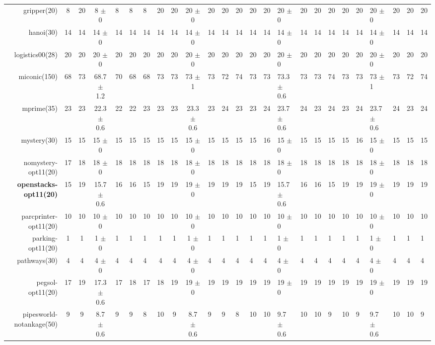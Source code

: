 \begin{center}
\begin{tabular}{|rcccHHH|cccHHHHHHHHHHHHHHH|}
gripper(20) & 8 & 20 & 8 $\pm$ 0 & 8 & 8 & 8 & 20 & 20 & 20 $\pm$ 0 & 20 & 20 & 20 & 20 & 20 & 20 $\pm$ 0 & 20 & 20 & 20 & 20 & 20 & 20 $\pm$ 0 & 20 & 20 & 20\\
hanoi(30) & 14 & 14 & 14 $\pm$ 0 & 14 & 14 & 14 & 14 & 14 & 14 $\pm$ 0 & 14 & 14 & 14 & 14 & 14 & 14 $\pm$ 0 & 14 & 14 & 14 & 14 & 14 & 14 $\pm$ 0 & 14 & 14 & 14\\
logistics00(28) & 20 & 20 & 20 $\pm$ 0 & 20 & 20 & 20 & 20 & 20 & 20 $\pm$ 0 & 20 & 20 & 20 & 20 & 20 & 20 $\pm$ 0 & 20 & 20 & 20 & 20 & 20 & 20 $\pm$ 0 & 20 & 20 & 20\\
miconic(150) & 68 & 73 & 68.7 $\pm$ 1.2 & 70 & 68 & 68 & 73 & 73 & 73 $\pm$ 1 & 73 & 72 & 74 & 73 & 73 & 73.3 $\pm$ 0.6 & 73 & 73 & 74 & 73 & 73 & 73 $\pm$ 1 & 73 & 72 & 74\\
mprime(35) & 23 & 23 & 22.3 $\pm$ 0.6 & 22 & 22 & 23 & 23 & 23 & 23.3 $\pm$ 0.6 & 23 & 24 & 23 & 23 & 24 & 23.7 $\pm$ 0.6 & 24 & 23 & 24 & 23 & 24 & 23.7 $\pm$ 0.6 & 24 & 23 & 24\\
mystery(30) & 15 & 15 & 15 $\pm$ 0 & 15 & 15 & 15 & 15 & 15 & 15 $\pm$ 0 & 15 & 15 & 15 & 15 & 16 & 15 $\pm$ 0 & 15 & 15 & 15 & 15 & 16 & 15 $\pm$ 0 & 15 & 15 & 15\\
nomystery-opt11(20) & 17 & 18 & 18 $\pm$ 0 & 18 & 18 & 18 & 18 & 18 & 18 $\pm$ 0 & 18 & 18 & 18 & 18 & 18 & 18 $\pm$ 0 & 18 & 18 & 18 & 18 & 18 & 18 $\pm$ 0 & 18 & 18 & 18\\
\textbf{openstacks-opt11(20)} & 15 & 19 & 15.7 $\pm$ 0.6 & 16 & 16 & 15 & 19 & 19 & 19 $\pm$ 0 & 19 & 19 & 19 & 15 & 19 & 15.7 $\pm$ 0.6 & 16 & 16 & 15 & 19 & 19 & 19 $\pm$ 0 & 19 & 19 & 19\\
parcprinter-opt11(20) & 10 & 10 & 10 $\pm$ 0 & 10 & 10 & 10 & 10 & 10 & 10 $\pm$ 0 & 10 & 10 & 10 & 10 & 10 & 10 $\pm$ 0 & 10 & 10 & 10 & 10 & 10 & 10 $\pm$ 0 & 10 & 10 & 10\\
parking-opt11(20) & 1 & 1 & 1 $\pm$ 0 & 1 & 1 & 1 & 1 & 1 & 1 $\pm$ 0 & 1 & 1 & 1 & 1 & 1 & 1 $\pm$ 0 & 1 & 1 & 1 & 1 & 1 & 1 $\pm$ 0 & 1 & 1 & 1\\
pathways(30) & 4 & 4 & 4 $\pm$ 0 & 4 & 4 & 4 & 4 & 4 & 4 $\pm$ 0 & 4 & 4 & 4 & 4 & 4 & 4 $\pm$ 0 & 4 & 4 & 4 & 4 & 4 & 4 $\pm$ 0 & 4 & 4 & 4\\
pegsol-opt11(20) & 17 & 19 & 17.3 $\pm$ 0.6 & 17 & 18 & 17 & 18 & 19 & 19 $\pm$ 0 & 19 & 19 & 19 & 19 & 19 & 19 $\pm$ 0 & 19 & 19 & 19 & 19 & 19 & 19 $\pm$ 0 & 19 & 19 & 19\\
pipesworld-notankage(50) & 9 & 9 & 8.7 $\pm$ 0.6 & 9 & 9 & 8 & 10 & 9 & 8.7 $\pm$ 0.6 & 9 & 9 & 8 & 10 & 10 & 9.7 $\pm$ 0.6 & 10 & 10 & 9 & 10 & 9 & 9.7 $\pm$ 0.6 & 10 & 10 & 9\\

\end{tabular}
\end{center}
